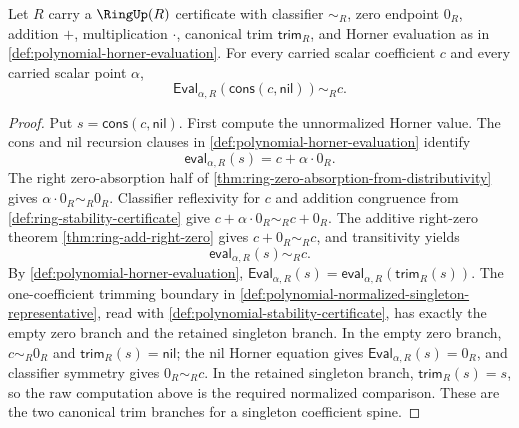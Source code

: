 \begin{theorem}
\label{thm:polynomial-singleton-evaluation}
Let $R$ carry a $\RingUp(R)$ certificate with classifier $\sim_R$, zero endpoint $0_R$, addition $+$, multiplication $\cdot$, canonical trim $\mathsf{trim}_R$, and Horner evaluation as in \autoref{def:polynomial-horner-evaluation}. For every carried scalar coefficient $c$ and every carried scalar point $\alpha$,
$$
\mathsf{Eval}_{\alpha,R}(\mathsf{cons}(c,\mathsf{nil}))\sim_R c.
$$
\end{theorem}
\begin{proof}
Put $s=\mathsf{cons}(c,\mathsf{nil})$. First compute the unnormalized Horner value. The cons and nil recursion clauses in \autoref{def:polynomial-horner-evaluation} identify
$$
\mathsf{eval}_{\alpha,R}(s)=c+\alpha\cdot0_R.
$$
The right zero-absorption half of \autoref{thm:ring-zero-absorption-from-distributivity} gives $\alpha\cdot0_R\sim_R0_R$. Classifier reflexivity for $c$ and addition congruence from \autoref{def:ring-stability-certificate} give $c+\alpha\cdot0_R\sim_Rc+0_R$. The additive right-zero theorem \autoref{thm:ring-add-right-zero} gives $c+0_R\sim_Rc$, and transitivity yields
$$
\mathsf{eval}_{\alpha,R}(s)\sim_Rc.
$$
By \autoref{def:polynomial-horner-evaluation}, $\mathsf{Eval}_{\alpha,R}(s)=\mathsf{eval}_{\alpha,R}(\mathsf{trim}_R(s))$. The one-coefficient trimming boundary in \autoref{def:polynomial-normalized-singleton-representative}, read with \autoref{def:polynomial-stability-certificate}, has exactly the empty zero branch and the retained singleton branch. In the empty zero branch, $c\sim_R0_R$ and $\mathsf{trim}_R(s)=\mathsf{nil}$; the nil Horner equation gives $\mathsf{Eval}_{\alpha,R}(s)=0_R$, and classifier symmetry gives $0_R\sim_Rc$. In the retained singleton branch, $\mathsf{trim}_R(s)=s$, so the raw computation above is the required normalized comparison. These are the two canonical trim branches for a singleton coefficient spine.
\end{proof}


